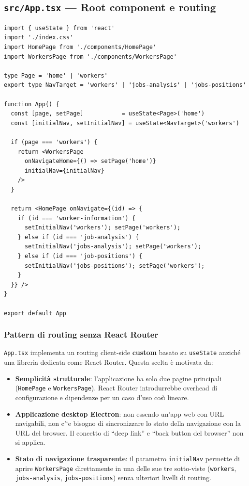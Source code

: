 \documentclass[a4paper,12pt]{article}
\begin{document}
\subsection{\texttt{src/App.tsx} --- Root component e routing}

\begin{lstlisting}[caption={\texttt{App.tsx} --- routing client-side e gestione navigazione.}]
import { useState } from 'react'
import './index.css'
import HomePage from './components/HomePage'
import WorkersPage from './components/WorkersPage'

type Page = 'home' | 'workers'
export type NavTarget = 'workers' | 'jobs-analysis' | 'jobs-positions'

function App() {
  const [page, setPage]           = useState<Page>('home')
  const [initialNav, setInitialNav] = useState<NavTarget>('workers')

  if (page === 'workers') {
    return <WorkersPage
      onNavigateHome={() => setPage('home')}
      initialNav={initialNav}
    />
  }

  return <HomePage onNavigate={(id) => {
    if (id === 'worker-information') {
      setInitialNav('workers'); setPage('workers');
    } else if (id === 'job-analysis') {
      setInitialNav('jobs-analysis'); setPage('workers');
    } else if (id === 'job-positions') {
      setInitialNav('jobs-positions'); setPage('workers');
    }
  }} />
}

export default App
\end{lstlisting}

\noindent \subsubsection{Pattern di routing senza React Router}

\texttt{App.tsx} implementa un routing client-side \textbf{custom}
basato su \texttt{useState} anzich\'{e} una libreria dedicata come
React Router. Questa scelta \`{e} motivata da:

\begin{itemize}
  \item \textbf{Semplicit\`{a} strutturale}: l'applicazione ha solo
        due pagine principali (\texttt{HomePage} e \texttt{WorkersPage}).
        React Router introdurrebbe overhead di configurazione e dipendenze
        per un caso d'uso cos\`{\i} lineare.
  \item \textbf{Applicazione desktop Electron}: non essendo un'app web
        con URL navigabili, non c'`{e} bisogno di sincronizzare lo stato
        della navigazione con la URL del browser. Il concetto di
        ``deep link'' e ``back button del browser'' non si applica.
  \item \textbf{Stato di navigazione trasparente}: il parametro
        \texttt{initialNav} permette di aprire \texttt{WorkersPage}
        direttamente in una delle sue tre sotto-viste
        (\texttt{workers}, \texttt{jobs-analysis}, \texttt{jobs-positions})
        senza ulteriori livelli di routing.
\end{itemize}
\end{document}
